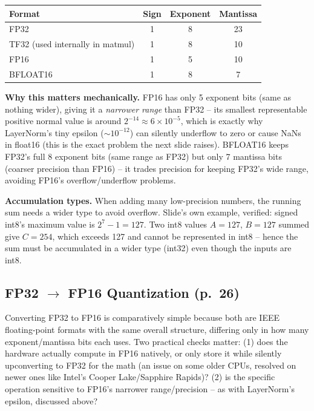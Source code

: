 \documentclass[11pt]{article}
\begin{document}
\begin{center}
\begin{tabular}{lccc}
\toprule
Format & Sign & Exponent & Mantissa \\
\midrule
FP32 & 1 & 8 & 23 \\
TF32 (used internally in matmul) & 1 & 8 & 10 \\
FP16 & 1 & 5 & 10 \\
BFLOAT16 & 1 & 8 & 7 \\
\bottomrule
\end{tabular}
\end{center}

\textbf{Why this matters mechanically.} FP16 has only 5 exponent bits (same as nothing wider), giving it a \emph{narrower range} than FP32 -- its smallest representable positive normal value is around $2^{-14}\approx6\times10^{-5}$, which is exactly why LayerNorm's tiny epsilon ($\sim10^{-12}$) can silently underflow to zero or cause NaNs in float16 (this is the exact problem the next slide raises). BFLOAT16 keeps FP32's full 8 exponent bits (same range as FP32) but only 7 mantissa bits (coarser precision than FP16) -- it trades precision for keeping FP32's wide range, avoiding FP16's overflow/underflow problems.

\textbf{Accumulation types.} When adding many low-precision numbers, the running sum needs a wider type to avoid overflow. Slide's own example, verified: signed int8's maximum value is $2^7-1=127$. Two int8 values $A=127$, $B=127$ summed give $C=254$, which exceeds 127 and cannot be represented in int8 -- hence the sum must be accumulated in a wider type (int32) even though the inputs are int8.

\subsection{FP32 $\to$ FP16 Quantization (p.\ 26)}

Converting FP32 to FP16 is comparatively simple because both are IEEE floating-point formats with the same overall structure, differing only in how many exponent/mantissa bits each uses. Two practical checks matter: (1) does the hardware actually compute in FP16 natively, or only store it while silently upconverting to FP32 for the math (an issue on some older CPUs, resolved on newer ones like Intel's Cooper Lake/Sapphire Rapids)? (2) is the specific operation sensitive to FP16's narrower range/precision -- as with LayerNorm's epsilon, discussed above?
\end{document}
